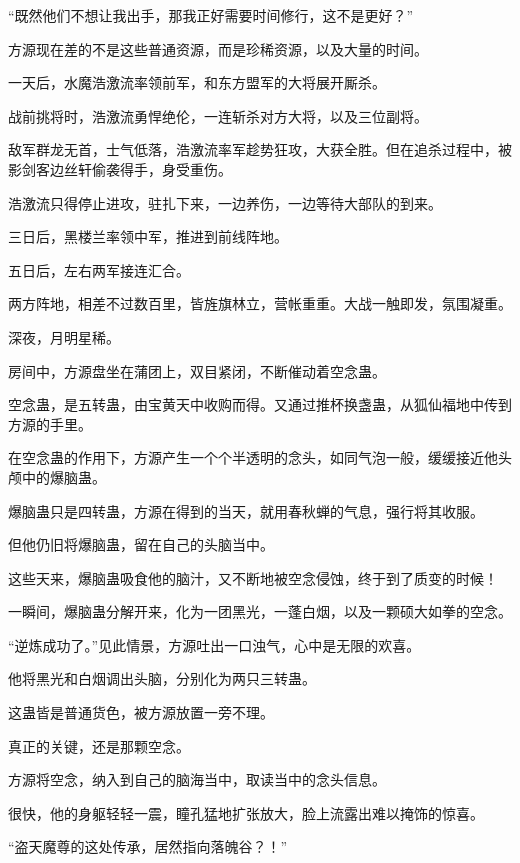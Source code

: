 \begin{this_body}
“既然他们不想让我出手，那我正好需要时间修行，这不是更好？”

方源现在差的不是这些普通资源，而是珍稀资源，以及大量的时间。

一天后，水魔浩激流率领前军，和东方盟军的大将展开厮杀。

战前挑将时，浩激流勇悍绝伦，一连斩杀对方大将，以及三位副将。

敌军群龙无首，士气低落，浩激流率军趁势狂攻，大获全胜。但在追杀过程中，被影剑客边丝轩偷袭得手，身受重伤。

浩激流只得停止进攻，驻扎下来，一边养伤，一边等待大部队的到来。

三日后，黑楼兰率领中军，推进到前线阵地。

五日后，左右两军接连汇合。

两方阵地，相差不过数百里，皆旌旗林立，营帐重重。大战一触即发，氛围凝重。

深夜，月明星稀。

房间中，方源盘坐在蒲团上，双目紧闭，不断催动着空念蛊。

空念蛊，是五转蛊，由宝黄天中收购而得。又通过推杯换盏蛊，从狐仙福地中传到方源的手里。

在空念蛊的作用下，方源产生一个个半透明的念头，如同气泡一般，缓缓接近他头颅中的爆脑蛊。

爆脑蛊只是四转蛊，方源在得到的当天，就用春秋蝉的气息，强行将其收服。

但他仍旧将爆脑蛊，留在自己的头脑当中。

这些天来，爆脑蛊吸食他的脑汁，又不断地被空念侵蚀，终于到了质变的时候！

一瞬间，爆脑蛊分解开来，化为一团黑光，一蓬白烟，以及一颗硕大如拳的空念。

“逆炼成功了。”见此情景，方源吐出一口浊气，心中是无限的欢喜。

他将黑光和白烟调出头脑，分别化为两只三转蛊。

这蛊皆是普通货色，被方源放置一旁不理。

真正的关键，还是那颗空念。

方源将空念，纳入到自己的脑海当中，取读当中的念头信息。

很快，他的身躯轻轻一震，瞳孔猛地扩张放大，脸上流露出难以掩饰的惊喜。

“盗天魔尊的这处传承，居然指向落魄谷？！”

\end{this_body}

